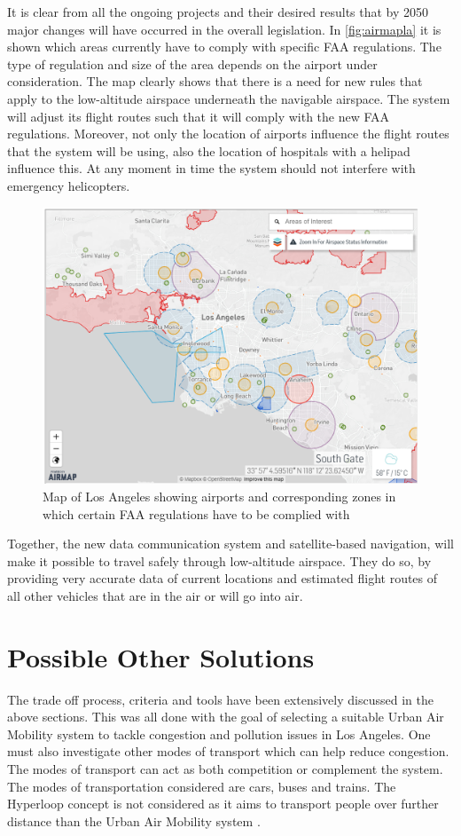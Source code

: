 It is clear from all the ongoing projects and their desired results that by 2050 major changes will have occurred in the overall legislation. In \autoref{fig:airmapla} it is shown which areas currently have to comply with specific FAA regulations. The type of regulation and size of the area depends on the airport under consideration. The map clearly shows that there is a need for new rules that apply to the low-altitude airspace underneath the navigable airspace. The system will adjust its flight routes such that it will comply with the new FAA regulations. Moreover, not only the location of airports influence the flight routes that the system will be using, also the location of hospitals with a helipad influence this. At any moment in time the system should not interfere with emergency helicopters. 

\begin{figure}[H]
    \centering
    \includegraphics[width=0.75\linewidth]{Figures/AirMapLA.png}
    \captionsetup{justification=centering}
    \caption{Map of Los Angeles showing airports and corresponding zones in which certain FAA regulations have to be complied with \protect\footnotemark}
    \label{fig:airmapla}
\end{figure}


Together, the new data communication system and satellite-based navigation, will make it possible to travel safely through low-altitude airspace. They do so, by providing very accurate data of current locations and estimated flight routes of all other vehicles that are in the air or will go into air. 




\section{Possible Other Solutions}
\label{comparisonmodesoftransport}
The trade off process, criteria and tools have been extensively discussed in the above sections. This was all done with the goal of selecting a suitable Urban Air Mobility system to tackle congestion and pollution issues in Los Angeles. One must also investigate other modes of transport which can help reduce congestion. The modes of transport can act as both competition or complement the system. The modes of transportation considered are cars, buses and trains. The Hyperloop concept is not considered as it aims to transport people over further distance than the Urban Air Mobility system \cite{hyperloopsucks}.
